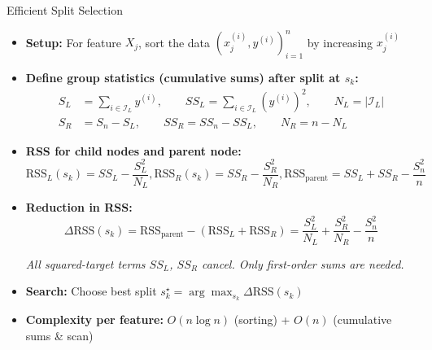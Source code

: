 \documentclass[11pt,compress,t,notes=noshow, aspectratio=169, xcolor=table]{beamer}
\begin{document}
\begin{frame}{Efficient Split Selection}
\begin{itemize}
  \item \textbf{Setup:} For feature \(X_j\), sort the data \((x_j^{(i)}, y^{(i)})_{i=1}^n\) by increasing \(x_j^{(i)}\)


  \item \textbf{Define group statistics (cumulative sums) after split at $s_k$:}
      \[
    \begin{aligned}
      S_L &= \textstyle\sum_{i \in \mathcal{I}_L} y^{(i)}, \qquad
      SS_L = \sum_{i \in \mathcal{I}_L} (y^{(i)})^2, \qquad
      N_L = |\mathcal{I}_L| \\
      S_R &= \textstyle S_n - S_L, \qquad
      SS_R = SS_n - SS_L, \qquad
      N_R = n - N_L
    \end{aligned}
    \]

  \item \textbf{RSS for child nodes and parent node:}
    \[
      \text{RSS}_L(s_k) = SS_L - \frac{S_L^2}{N_L}, 
      \text{RSS}_R(s_k) = SS_R - \frac{S_R^2}{N_R}, 
      \text{RSS}_{\text{parent}} = SS_L + SS_R - \frac{S_n^2}{n}
    \]
  \item<2-> \textbf{Reduction in RSS:}
    \[
      \Delta\text{RSS}(s_k) = \text{RSS}_{\text{parent}} - (\text{RSS}_L + \text{RSS}_R)
      = \frac{S_L^2}{N_L} + \frac{S_R^2}{N_R} - \frac{S_n^2}{n}
    \]

    \emph{All squared-target terms \( SS_L \), \( SS_R \) cancel. Only first-order sums are needed.}

  \item<2-> \textbf{Search:} Choose best split \(s_k^\star = \arg\max_{s_k} \Delta\text{RSS}(s_k)\)

  \item<2-> \textbf{Complexity per feature:}\; \(O(n\log n)\) (sorting) + \(O(n)\) (cumulative sums \& scan)
\end{itemize}
\end{frame}
\end{document}
